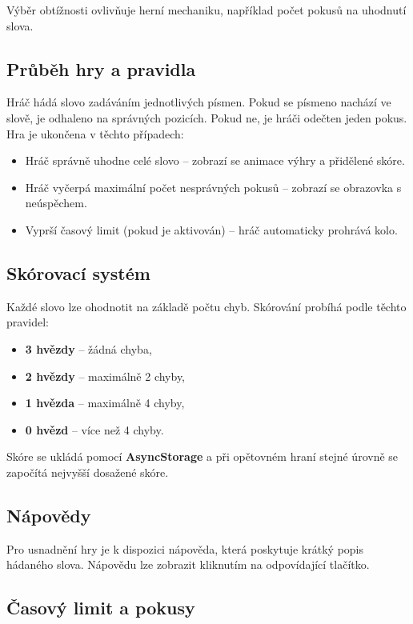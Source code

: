 \documentclass[a4paper,12pt]{article}
\begin{document}
Výběr obtížnosti ovlivňuje herní mechaniku, například počet pokusů na uhodnutí slova.

\subsection{Průběh hry a pravidla}

Hráč hádá slovo zadáváním jednotlivých písmen. Pokud se písmeno nachází ve slově, je odhaleno na správných pozicích. Pokud ne, je hráči odečten jeden pokus. Hra je ukončena v těchto případech:
\begin{itemize}
    \item Hráč správně uhodne celé slovo – zobrazí se animace výhry a přidělené skóre.
    \item Hráč vyčerpá maximální počet nesprávných pokusů – zobrazí se obrazovka s neúspěchem.
    \item Vyprší časový limit (pokud je aktivován) – hráč automaticky prohrává kolo.
\end{itemize}

\subsection{Skórovací systém}

Každé slovo lze ohodnotit na základě počtu chyb. Skórování probíhá podle těchto pravidel:
\begin{itemize}
    \item \textbf{3 hvězdy} – žádná chyba,
    \item \textbf{2 hvězdy} – maximálně 2 chyby,
    \item \textbf{1 hvězda} – maximálně 4 chyby,
    \item \textbf{0 hvězd} – více než 4 chyby.
\end{itemize}

Skóre se ukládá pomocí \textbf{AsyncStorage} a při opětovném hraní stejné úrovně se započítá nejvyšší dosažené skóre.

\subsection{Nápovědy}

Pro usnadnění hry je k dispozici nápověda, která poskytuje krátký popis hádaného slova. Nápovědu lze zobrazit kliknutím na odpovídající tlačítko.

\subsection{Časový limit a pokusy}
\end{document}
